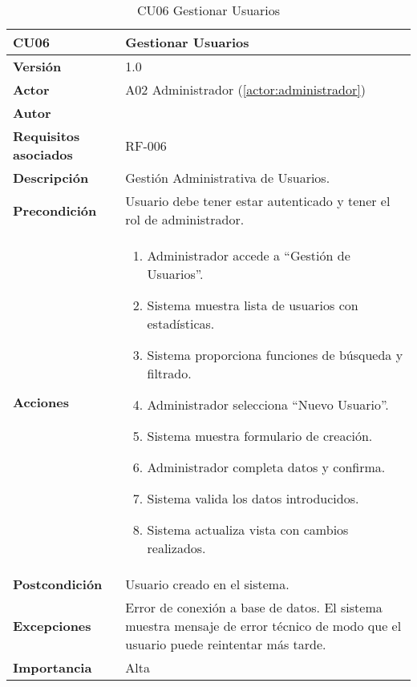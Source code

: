 \begin{table}[H]
	\centering
	\begin{tabularx}{\linewidth}{ p{} p{} }
		\toprule
		\textbf{CU06}    & \textbf{Gestionar Usuarios} \\
		\toprule
		\textbf{Versión}              & 1.0    \\
		\textbf{Actor}                & A02 Administrador (\ref{actor:administrador}) \\
		\textbf{Autor}                & \nombre \\
		\textbf{Requisitos asociados} & RF-006 \\
		\textbf{Descripción}          & Gestión Administrativa de Usuarios. \\
		\textbf{Precondición}         & Usuario debe tener estar autenticado y tener el rol de administrador. \\
		\textbf{Acciones}             &
		\begin{enumerate}
			\def\labelenumi{\arabic{enumi}.}
			\tightlist
			\item Administrador accede a ``Gestión de Usuarios''.
            \item Sistema muestra lista de usuarios con estadísticas.
            \item Sistema proporciona funciones de búsqueda y filtrado.
            \item Administrador selecciona ``Nuevo Usuario''.
 	    \item Sistema muestra formulario de creación.
            \item Administrador completa datos y confirma.
            \item Sistema valida los datos introducidos.
            \item Sistema actualiza vista con cambios realizados.
		\end{enumerate}\\
		\textbf{Postcondición}        & Usuario creado en el sistema.\\
		\textbf{Excepciones}          & Error de conexión a base de datos. El sistema muestra mensaje de error técnico de modo que el usuario puede reintentar más tarde.\\
		\textbf{Importancia}          & Alta \\
		\bottomrule
	\end{tabularx}
	\caption{CU06 Gestionar Usuarios}
	\label{cu:gestionar-usuarios}
\end{table}

